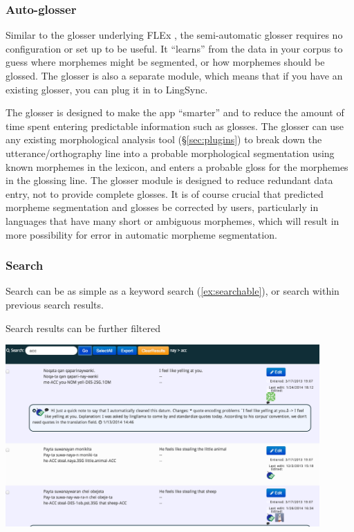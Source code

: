 \documentclass[letterpaper, 12pt, dvips]{mitwpl}
\begin{document}
\subsubsection{Auto-glosser}

 

Similar to the glosser underlying FLEx \citep{Black:2006}, the semi-automatic glosser requires no configuration or set up to be useful.
It ``learns'' from the data in your corpus to guess where morphemes might be segmented,
or how morphemes should be glossed.
The glosser is also a separate module,
which means that if you have an existing glosser, you can plug it in to LingSync.


The glosser is designed to make the app ``smarter'' and to reduce the amount of time spent entering predictable information such as glosses.
The glosser can use any existing morphological analysis tool (\S \ref{sec:plugins}) to break down the utterance/orthography line  into a probable morphological segmentation using known morphemes in the lexicon,
and enters a probable gloss for the morphemes in the glossing line.
The glosser module is designed to reduce redundant data entry,
not to provide complete glosses.
It is of course crucial that predicted morpheme segmentation and glosses be corrected by users,
particularly in languages that have many short or ambiguous morphemes,
which will result in more possibility for error in automatic morpheme segmentation.
 
\subsubsection{Search}


Search can be as simple as a keyword search (\ref{ex:searchable}),
or search within previous search results.

\begin{exe} 
\ex Search results can be further filtered

\hspace{-1in}
 \centering
   \includegraphics[width=0.9\textwidth]{spreadsheetsearch}

\label{ex:searchable}
\end{exe}
\end{document}
